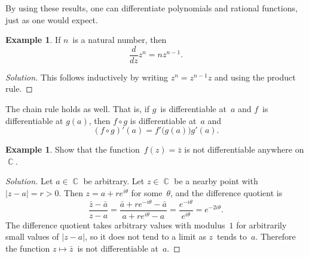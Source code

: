 \documentclass{amsproc}
\theoremstyle{definition}
\newtheorem{example}[theorem]{Example}
\newenvironment{solution}{\begin{proof}[Solution]}{\end{proof}}
\theoremstyle{remark}
\renewcommand{\d}{\partial}
\DeclareMathOperator{\C}{\mathbb{C}}
\numberwithin{equation}{section}
\begin{document}
By using these results, one can differentiate polynomials and rational functions, just as one would expect.

\begin{example}
If $ n $~is a natural number, then
$$
\dfrac{d}{dz}z^n = nz^{n-1}.
$$
\end{example}

\begin{solution}
This follows inductively by writing $ z^n = z^{n - 1} z $ and using the product rule.
\end{solution}

The chain rule holds as well. That is, if $g$~is differentiable at~$a$ and $f$~is differentiable at $ g(a) $, then $ f\circ g $ is differentiable at~$ a $ and
$$
(f \circ g)'(a) = f'\bigl(g(a)\bigr)g'(a).
$$




\begin{example} \label{CME1.3}
Show that the function~$ f(z) = \bar{z} $ is not differentiable anywhere on $ \C $.
\end{example}

\begin{solution}
Let $ a \in \C $ be arbitrary. Let $ z \in \C $ be a nearby point with $ |z - a| = r > 0 $. Then $ z = a + re^{i\theta} $ for some~$\theta$, and the difference quotient is
$$
\dfrac{\bar{z} - \bar{a}}{z - a} = \dfrac{\bar{a} + re^{-i\theta}-\bar{a}}{a + re^{i\theta} - a} = \dfrac{e^{-i\theta}}{e^{i\theta}} = e^{-2i\theta}.
$$
The difference quotient takes arbitrary values with modulus~$ 1 $ for arbitrarily small values of $ |z - a| $, so it does not tend to a limit as $ z $~tends to~$ a $.
Therefore the function $ z \mapsto \bar{z} $~is not differentiable at~$ a $.
\end{solution}
\end{document}
